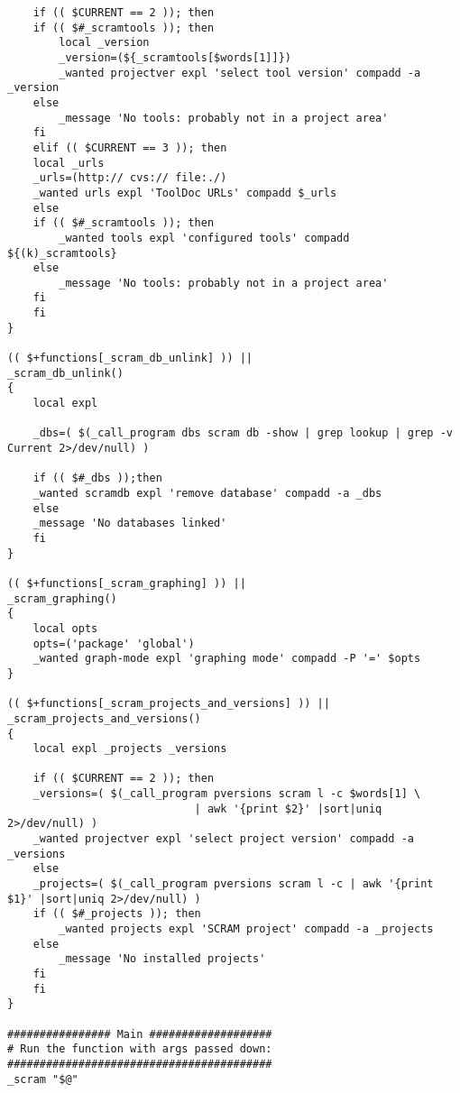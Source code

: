 {\begin{verbatim}
    if (( $CURRENT == 2 )); then
	if (( $#_scramtools )); then
	    local _version
	    _version=(${_scramtools[$words[1]]})
	    _wanted projectver expl 'select tool version' compadd -a _version
	else
	    _message 'No tools: probably not in a project area'
	fi
    elif (( $CURRENT == 3 )); then 
	local _urls
	_urls=(http:// cvs:// file:./)
	_wanted urls expl 'ToolDoc URLs' compadd $_urls
    else
	if (( $#_scramtools )); then
	    _wanted tools expl 'configured tools' compadd  ${(k)_scramtools}
	else
	    _message 'No tools: probably not in a project area'    
	fi
    fi
}

(( $+functions[_scram_db_unlink] )) || 
_scram_db_unlink()
{
    local expl

    _dbs=( $(_call_program dbs scram db -show | grep lookup | grep -v Current 2>/dev/null) )
    
    if (( $#_dbs ));then	
	_wanted scramdb expl 'remove database' compadd -a _dbs
    else
	_message 'No databases linked'
    fi
}

(( $+functions[_scram_graphing] )) || 
_scram_graphing()
{
    local opts
    opts=('package' 'global')
    _wanted graph-mode expl 'graphing mode' compadd -P '=' $opts
}

(( $+functions[_scram_projects_and_versions] )) || 
_scram_projects_and_versions()
{
    local expl _projects _versions
    
    if (( $CURRENT == 2 )); then
	_versions=( $(_call_program pversions scram l -c $words[1] \
                             | awk '{print $2}' |sort|uniq 2>/dev/null) )
	_wanted projectver expl 'select project version' compadd -a _versions
    else		
	_projects=( $(_call_program pversions scram l -c | awk '{print $1}' |sort|uniq 2>/dev/null) )
	if (( $#_projects )); then
	    _wanted projects expl 'SCRAM project' compadd -a _projects
	else
	    _message 'No installed projects'
	fi	
    fi
}

################ Main ###################
# Run the function with args passed down:
#########################################
_scram "$@"

\end{verbatim}}\normalsize


